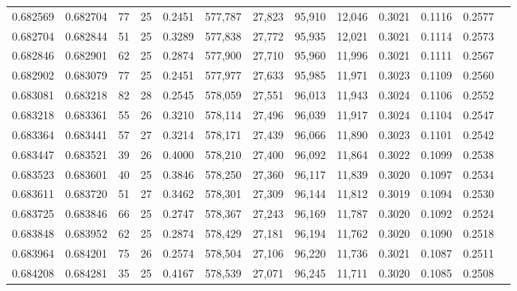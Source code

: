 \begin{tabular}{rrrrrrrrrrrrr}
0.682569 & 0.682704 &  77 &  25 &                                     0.2451 & 577,787 &  27,823 &  95,910 &  12,046 & 0.3021 & 0.1116 & 0.2577 \\
0.682704 & 0.682844 &  51 &  25 &                                     0.3289 & 577,838 &  27,772 &  95,935 &  12,021 & 0.3021 & 0.1114 & 0.2573 \\
0.682846 & 0.682901 &  62 &  25 &                                     0.2874 & 577,900 &  27,710 &  95,960 &  11,996 & 0.3021 & 0.1111 & 0.2567 \\
0.682902 & 0.683079 &  77 &  25 &                                     0.2451 & 577,977 &  27,633 &  95,985 &  11,971 & 0.3023 & 0.1109 & 0.2560 \\
0.683081 & 0.683218 &  82 &  28 &                                     0.2545 & 578,059 &  27,551 &  96,013 &  11,943 & 0.3024 & 0.1106 & 0.2552 \\
0.683218 & 0.683361 &  55 &  26 &                                     0.3210 & 578,114 &  27,496 &  96,039 &  11,917 & 0.3024 & 0.1104 & 0.2547 \\
0.683364 & 0.683441 &  57 &  27 &                                     0.3214 & 578,171 &  27,439 &  96,066 &  11,890 & 0.3023 & 0.1101 & 0.2542 \\
0.683447 & 0.683521 &  39 &  26 &                                     0.4000 & 578,210 &  27,400 &  96,092 &  11,864 & 0.3022 & 0.1099 & 0.2538 \\
0.683523 & 0.683601 &  40 &  25 &                                     0.3846 & 578,250 &  27,360 &  96,117 &  11,839 & 0.3020 & 0.1097 & 0.2534 \\
0.683611 & 0.683720 &  51 &  27 &                                     0.3462 & 578,301 &  27,309 &  96,144 &  11,812 & 0.3019 & 0.1094 & 0.2530 \\
0.683725 & 0.683846 &  66 &  25 &                                     0.2747 & 578,367 &  27,243 &  96,169 &  11,787 & 0.3020 & 0.1092 & 0.2524 \\
0.683848 & 0.683952 &  62 &  25 &                                     0.2874 & 578,429 &  27,181 &  96,194 &  11,762 & 0.3020 & 0.1090 & 0.2518 \\
0.683964 & 0.684201 &  75 &  26 &                                     0.2574 & 578,504 &  27,106 &  96,220 &  11,736 & 0.3021 & 0.1087 & 0.2511 \\
0.684208 & 0.684281 &  35 &  25 &                                     0.4167 & 578,539 &  27,071 &  96,245 &  11,711 & 0.3020 & 0.1085 & 0.2508 \\

\end{tabular}
